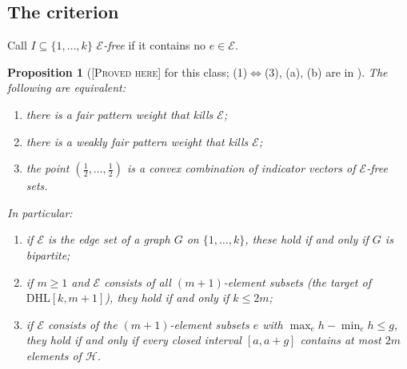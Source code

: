 \documentclass[11pt]{amsart}
\newtheorem{proposition}[theorem]{Proposition}
\theoremstyle{definition}
\theoremstyle{remark}
\newcommand{\lbl}[1]{\textup{\textsc{[#1]}}}
\begin{document}
\subsection{The criterion}
Call $I\subseteq\{1,\dots,k\}$ \emph{$\mathcal E$-free} if it contains no
$e\in\mathcal E$.

\begin{proposition}[\lbl{Proved here} for this class; (1)$\Leftrightarrow$(3), (a), (b) are in \cite{Tao14b}]\label{prop:bipartite}
The following are equivalent:
\begin{enumerate}
\item there is a fair pattern weight that kills $\mathcal E$;
\item there is a weakly fair pattern weight that kills $\mathcal E$;
\item the point $(\tfrac12,\dots,\tfrac12)$ is a convex combination of
  indicator vectors of $\mathcal E$-free sets.
\end{enumerate}
In particular:
\begin{enumerate}
\item[(a)] if $\mathcal E$ is the edge set of a graph $G$ on
  $\{1,\dots,k\}$, these hold if and only if $G$ is bipartite;
\item[(b)] if $m\ge1$ and $\mathcal E$ consists of all $(m+1)$-element subsets
  \textup{(}the target of $\mathrm{DHL}[k,m+1]$\textup{)}, they hold if and
  only if $k\le 2m$;
\item[(c)] if $\mathcal E$ consists of the $(m+1)$-element subsets
  $e$ with $\max_{e}h-\min_{e}h\le g$, they hold if and only if every closed
  interval $[a,a+g]$ contains at most $2m$ elements of $\mathcal H$.
\end{enumerate}
\end{proposition}
\end{document}

